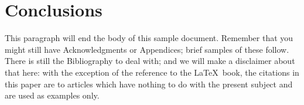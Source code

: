 
\section{Conclusions}
This paragraph will end the body of this sample document.
Remember that you might still have Acknowledgments or
Appendices; brief samples of these
follow.  There is still the Bibliography to deal with; and
we will make a disclaimer about that here: with the exception
of the reference to the \LaTeX\ book, the citations in
this paper are to articles which have nothing to
do with the present subject and are used as
examples only.
